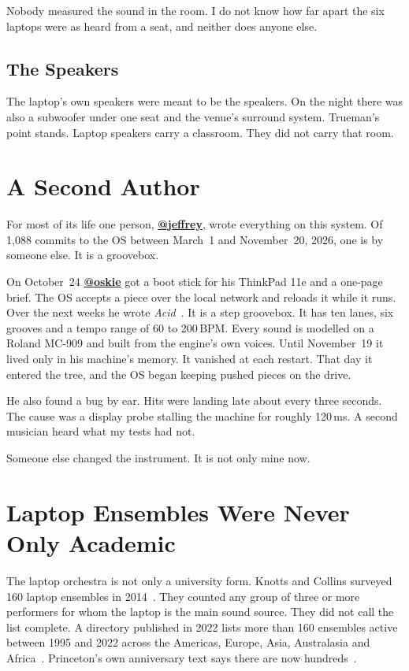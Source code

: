 \documentclass[10pt,letterpaper,twocolumn]{article}
\makeatletter
\DeclareRobustCommand{\handle}[1]{\href{https://prompt.ac/@#1}{\textbf{\color{achandle}@#1}}}
\makeatother
\begin{document}
Nobody measured the sound in the room. I do not know how far apart the six laptops were as heard from a seat, and neither does anyone else.

\subsection{The Speakers}

The laptop's own speakers were meant to be the speakers. On the night there was also a subwoofer under one seat and the venue's surround system. Trueman's point stands. Laptop speakers carry a classroom. They did not carry that room.


\section{A Second Author}
\label{sec:second}

For most of its life one person, \handle{jeffrey}, wrote everything on this system. Of 1,088 commits to the OS between March~1 and November~20, 2026, one is by someone else. It is a groovebox.

On October~24 \handle{oskie} got a boot stick for his ThinkPad 11e and a one-page brief. The OS accepts a piece over the local network and reloads it while it runs. Over the next weeks he wrote \emph{Acid}~\citep{oskie2026acid}. It is a step groovebox. It has ten lanes, six grooves and a tempo range of 60 to 200\,BPM. Every sound is modelled on a Roland MC-909 and built from the engine's own voices. Until November~19 it lived only in his machine's memory. It vanished at each restart. That day it entered the tree, and the OS began keeping pushed pieces on the drive.

He also found a bug by ear. Hits were landing late about every three seconds. The cause was a display probe stalling the machine for roughly 120\,ms. A second musician heard what my tests had not.

Someone else changed the instrument. It is not only mine now.


\section{Laptop Ensembles Were Never Only Academic}
\label{sec:landscape}

The laptop orchestra is not only a university form. Knotts and Collins surveyed 160 laptop ensembles in 2014~\citep{knotts2014politics}. They counted any group of three or more performers for whom the laptop is the main sound source. They did not call the list complete. A directory published in 2022 lists more than 160 ensembles active between 1995 and 2022 across the Americas, Europe, Asia, Australasia and Africa~\citep{woollard2022directory}. Princeton's own anniversary text says there are now hundreds~\citep{kapilevich2025plork}.
\end{document}
